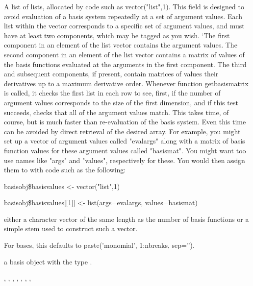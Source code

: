 \begin{Arguments}
\begin{ldescription}
\item[\code{basisvalues}] A list of lists, allocated by code such as vector("list",1).  This
field is designed to avoid evaluation of a basis system repeatedly
at a set of argument values.  Each list within the vector
corresponds to a specific set of argument values, and must have at
least two components, which may be tagged as you wish.  `The first
component in an element of the list vector contains the argument
values.  The second component in an element of the list vector
contains a matrix of values of the basis functions evaluated at the
arguments in the first component.  The third and subsequent
components, if present, contain matrices of values their derivatives
up to a maximum derivative order.  Whenever function getbasismatrix
is called, it checks the first list in each row to see, first, if
the number of argument values corresponds to the size of the first
dimension, and if this test succeeds, checks that all of the
argument values match.  This takes time, of course, but is much
faster than re-evaluation of the basis system.  Even this time can
be avoided by direct retrieval of the desired array.  For example,
you might set up a vector of argument values called "evalargs" along
with a matrix of basis function values for these argument values
called "basismat".  You might want too use names like "args" and
"values", respectively for these.  You would then assign them to
 with code such as the following:

basisobj\$basisvalues <- vector("list",1)

basisobj\$basisvalues[[1]] <- list(args=evalargs,
values=basismat)

\item[\code{names}] either a character vector of the same length as the number of basis
functions or a simple stem used to construct such a vector.

For  bases, this defaults to paste('monomial',
1:nbreaks, sep='').

\end{ldescription}
\end{Arguments}
\begin{Value}
a basis object with the type .
\end{Value}
\begin{SeeAlso}\relax
{},
,
,
,
,
,
,
\end{SeeAlso}
